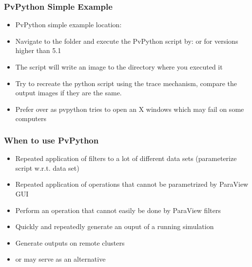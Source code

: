 \begin{frame}

  \frametitle{PvPython Simple Example}

  \begin{itemize}
      \item PvPython simple example location: 

      \item Navigate to the folder and execute the PvPython script by:  or for versions higher than 5.1

      \item The script will write an image  to the directory where you executed it 
      \item {} Try to recreate the python script using the trace mechanism, compare the output images if they are the same.

      \item {} Prefer  over  as pvpython tries to open an X windows which may fail on some computers    
  \end{itemize}

\end{frame}

\begin{frame}

  \frametitle{When to use PvPython}

  \begin{itemize}

    \item Repeated application of filters to a lot of different data sets (parameterize script w.r.t. data set) 

    \item Repeated application of operations that cannot be parametrized by ParaView GUI

    \item Perform an operation that cannot easily be done by ParaView filters 

    \item Quickly and repeatedly generate an ouput of a running simulation 

    \item Generate outputs on remote clusters 

    \item {} or  may serve as an alternative 

  \end{itemize}

\end{frame}



